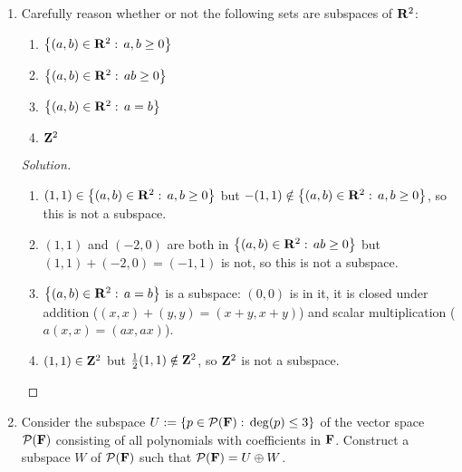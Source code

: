 \documentclass[11pt]{amsart}
\begin{document}
\begin{enumerate}[(1)]
\begin{proof}
Now suppose $u_j, w_j \in U_j$ for each $j$; that is, we have two elements $u_1 + u_2 + \dots + u_n \in U_1 + U_2 + \dots + U_n$ and $w_1 + w_2 + \dots + w_n \in U_1 + U_2 + \dots + U_n$. Since $u_j + w_j \in U_j$ (because $U_j$ is a subspace),
\[
  u_1 + u_2 + \dots u_n + w_1 + w_2 + \dots w_n
  = \left( u_1 + w_1 \right) + \left( u_2 + w_2 \right) + \dots + \left( u_n + w_n \right)
  \in U_1 + U_2 + \dots + U_n \, ,
\]
that is, $U_1 + U_2 + \dots + U_n$ is closed under addition.
Similarly, given $a \in \F$, we know that $a u_j \in U_j$ (again because $U_j$ is a subspace), and so
\[
  a \left( u_1 + u_2 + \dots + u_n \right)
  = a u_1 + a u_2 + \dots + a u_n
  \in U_1 + U_2 + \dots + U_n \, ,
\]
that is, $U_1 + U_2 + \dots + U_n$ is closed under scalar multiplication.
\end{proof}

\item Carefully reason whether or not the following sets are subspaces of $\mathbf{R}^2$:
  \begin{enumerate} 
  \item $\left\{ (a,b) \in \mathbf{R}^2 : \, a, b \ge 0 \right\}$
  \item $\left\{ (a,b) \in \mathbf{R}^2 : \, ab \ge 0 \right\}$
  \item $\left\{ (a,b) \in \mathbf{R}^2 : \, a=b \right\}$
  \item $\mathbf{Z}^2$
  \end{enumerate}

\begin{proof}[Solution]
  \begin{enumerate} 
  \item $(1,1) \in \left\{ (a,b) \in \mathbf{R}^2 : \, a, b \ge 0 \right\}$ but $-(1,1) \notin \left\{ (a,b) \in \mathbf{R}^2 : \, a, b \ge 0 \right\}$, so this is not a subspace.
  \item $(1,1)$ and $(-2,0)$ are both in $\left\{ (a,b) \in \mathbf{R}^2 : \, ab \ge 0 \right\}$ but $(1,1) + (-2,0) = (-1,1)$ is not, so this is not a subspace.
  \item $\left\{ (a,b) \in \mathbf{R}^2 : \, a=b \right\}$ is a subspace: $(0,0)$ is in it, it is closed under addition ($(x,x) + (y,y) = (x+y, x+y)$) and scalar multiplication ($a(x,x) = (ax,ax)$).
  \item $(1,1) \in \mathbf{Z}^2$ but $\frac 1 2 (1,1) \notin \mathbf{Z}^2$, so $\mathbf{Z}^2$ is not a subspace. \qedhere
  \end{enumerate}
\end{proof}

\item Consider the subspace $U := \left\{ p \in \mathcal{P}(\mathbf{F}) : \, \deg(p) \le 3 \right\}$ of the vector space $\mathcal{P}(\mathbf{F})$ consisting of all polynomials with coefficients in $\mathbf{F}$. Construct a subspace $W$ of $\mathcal{P}(\mathbf{F})$ such that $\mathcal{P}(\mathbf{F}) = U \oplus W$.


\end{enumerate}
\end{document}
